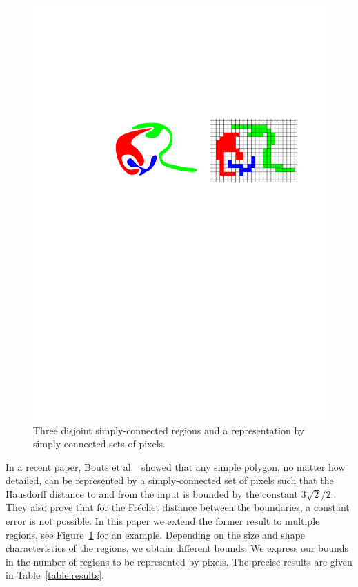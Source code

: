 \documentclass[a4paper,UKenglish,cleveref]{lipics-v2019}
\newcommand{\etal}{\textnormal{et al.}\xspace}
\begin{document}
\begin{figure}[htb]
\centering
\includegraphics[]{introfig.pdf}
\caption{Three disjoint simply-connected regions and a representation by simply-connected sets of pixels.}
\label{fig:intro}
\end{figure}

In a recent paper, Bouts \etal~\cite{bouts2016mapping} showed that any simple polygon, no matter how detailed, can be represented by a simply-connected set of pixels such that the Hausdorff distance to and from the input is bounded by the constant $3\sqrt{2}/2$. They also prove that for the Fr\'echet distance between the boundaries, a constant error is not possible.
In this paper we extend the former result to multiple regions, see Figure~\ref{fig:intro} for an example. Depending on the size and shape characteristics of the regions, we obtain different bounds. We express our bounds in the number of regions to be represented by pixels. The precise results are given in Table~\ref{table:results}.
\end{document}
